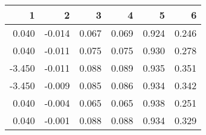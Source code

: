 \begin{table}[ht]
\centering
\begin{tabular}{rrrrrr}
  \hline
1 & 2 & 3 & 4 & 5 & 6 \\ 
  \hline
0.040 & -0.014 & 0.067 & 0.069 & 0.924 & 0.246 \\ 
  0.040 & -0.011 & 0.075 & 0.075 & 0.930 & 0.278 \\ 
  -3.450 & -0.011 & 0.088 & 0.089 & 0.935 & 0.351 \\ 
  -3.450 & -0.009 & 0.085 & 0.086 & 0.934 & 0.342 \\ 
  0.040 & -0.004 & 0.065 & 0.065 & 0.938 & 0.251 \\ 
  0.040 & -0.001 & 0.088 & 0.088 & 0.934 & 0.329 \\ 
   \hline
\end{tabular}
\end{table}
